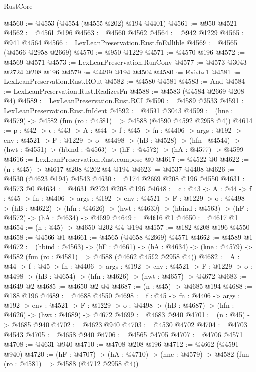 \begin{lexlean}{RustCore}
\begin{coremodule}
@4560 := @4553 (@4554 (@4555 @202) @194 @4401)
@4561 := @950 @4521
@4562 := @4561 @196
@4563 := @4560 @4562
@4564 := @942 @1229
@4565 := @941 @4564
@4566 := LexLeanPreservation.Rust.fnFallible
@4569 := @4565 (@4566 @2958 @2669)
@4570 := @950 @1229
@4571 := @4570 @196
@4572 := @4569 @4571
@4573 := LexLeanPreservation.RunConv
@4577 := @4573 @3043 @2724 @208 @196
@4579 := @4499 @194 @4504
@4580 := Exists.{1}
@4581 := LexLeanPreservation.Rust.ROut
@4582 := @4580 @4581
@4583 := And
@4584 := LexLeanPreservation.Rust.RealizesFn
@4588 := @4583 (@4584 @2669 @208 @4)
@4589 := LexLeanPreservation.Rust.RCI
@4590 := @4589 @3533
@4591 := LexLeanPreservation.Rust.fnIdent
@4592 := @4591 @3043
@4599 := (hne : @4579) -> @4582 (fun (ro : @4581) => @4588 (@4590 @4592 @2958 @4))
@4614 := {p : @42} ->
  {c : @43} ->
  {A : @44} ->
  {f : @45} ->
  {fn : @4406} ->
  {args : @192} ->
  {env : @4521} ->
  {F : @1229} ->
  {o : @4498} ->
  (hB : @4528) ->
  (hfn : @4544) -> (hwt : @4551) -> (hbind : @4563) -> (hF : @4572) -> (hA : @4577) -> @4599
@4616 := LexLeanPreservation.Rust.compose @0
@4617 := @4522 @0
@4622 := (n : @45) -> @4617 @208 @202 @4 @194
@4623 := @4537 @4408
@4626 := @4530 (@4623 @194) @4543
@4630 := @174 @2669 @208 @196 @4550
@4631 := @4573 @0
@4634 := @4631 @2724 @208 @196
@4648 := {c : @43} ->
  {A : @44} ->
  {f : @45} ->
  {fn : @4406} ->
  {args : @192} ->
  {env : @4521} ->
  {F : @1229} ->
  {o : @4498} ->
  (hB : @4622) ->
  (hfn : @4626) -> (hwt : @4630) -> (hbind : @4563) -> (hF : @4572) -> (hA : @4634) -> @4599
@4649 := @4616 @1
@4650 := @4617 @1
@4654 := (n : @45) -> @4650 @202 @4 @194
@4657 := @182 @208 @196 @4550
@4658 := @4566 @1
@4661 := @4565 (@4658 @2669) @4571
@4662 := @4589 @1
@4672 := (hbind : @4563) ->
  (hF : @4661) ->
  (hA : @4634) -> (hne : @4579) -> @4582 (fun (ro : @4581) => @4588 (@4662 @4592 @2958 @4))
@4682 := {A : @44} ->
  {f : @45} ->
  {fn : @4406} ->
  {args : @192} ->
  {env : @4521} ->
  {F : @1229} -> {o : @4498} -> (hB : @4654) -> (hfn : @4626) -> (hwt : @4657) -> @4672
@4683 := @4649 @2
@4685 := @4650 @2 @4
@4687 := (n : @45) -> @4685 @194
@4688 := @188 @196
@4689 := @4688 @4550
@4698 := {f : @45} ->
  {fn : @4406} ->
  {args : @192} ->
  {env : @4521} ->
  {F : @1229} -> {o : @4498} -> (hB : @4687) -> (hfn : @4626) -> (hwt : @4689) -> @4672
@4699 := @4683 @940
@4701 := (n : @45) -> @4685 @940
@4702 := @4623 @940
@4703 := @4530 @4702
@4704 := @4703 @4543
@4705 := @4658 @940
@4706 := @4565 @4705
@4707 := @4706 @4571
@4708 := @4631 @940
@4710 := @4708 @208 @196
@4712 := @4662 (@4591 @940)
@4720 := (hF : @4707) ->
  (hA : @4710) -> (hne : @4579) -> @4582 (fun (ro : @4581) => @4588 (@4712 @2958 @4))

\end{coremodule}
\end{lexlean}
